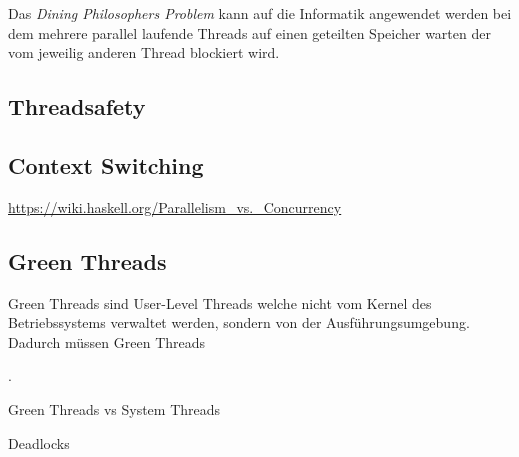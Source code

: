 Das \emph{Dining Philosophers Problem} kann auf die Informatik angewendet werden bei dem mehrere parallel laufende Threads auf einen geteilten Speicher warten der vom jeweilig anderen Thread blockiert wird. 

\subsection{Threadsafety}



\subsection{Context Switching}

\url{https://wiki.haskell.org/Parallelism_vs._Concurrency}



\subsection{Green Threads}
Green Threads sind User-Level Threads welche nicht vom Kernel des Betriebssystems verwaltet werden, sondern von der Ausführungsumgebung. Dadurch müssen Green Threads 


 \cite[p.2]{Sun01}.


Green Threads vs System Threads

Deadlocks